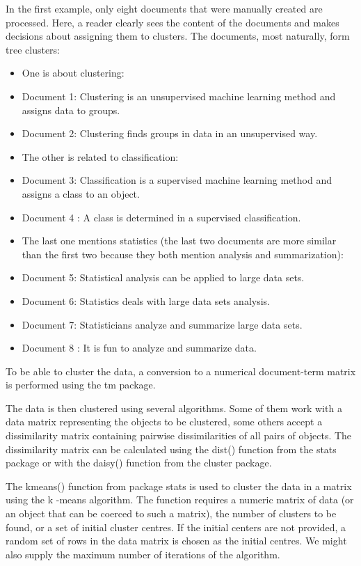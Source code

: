 \documentclass[11pt,openany,executivepaper]{book}
\begin{document}
In the first example, only eight documents that were manually created are processed. Here, a reader clearly sees the content of the documents and makes decisions about assigning them to clusters. The documents, most naturally, form tree clusters:

\begin{itemize}
  \item One is about clustering:
  \item Document 1: Clustering is an unsupervised machine learning method and assigns data to groups.
  \item Document 2: Clustering finds groups in data in an unsupervised way.
  \item The other is related to classification:
  \item Document 3: Classification is a supervised machine learning method and assigns a class to an object.
  \item Document 4 : A class is determined in a supervised classification.
  \item The last one mentions statistics (the last two documents are more similar than the first two because they both mention analysis and summarization):
  \item Document 5: Statistical analysis can be applied to large data sets.
  \item Document 6: Statistics deals with large data sets analysis.
  \item Document 7: Statisticians analyze and summarize large data sets.
  \item Document 8 : It is fun to analyze and summarize data.
\end{itemize}

To be able to cluster the data, a conversion to a numerical document-term matrix is performed using the tm package.

The data is then clustered using several algorithms. Some of them work with a data matrix representing the objects to be clustered, some others accept a dissimilarity matrix containing pairwise dissimilarities of all pairs of objects. The\\
dissimilarity matrix can be calculated using the dist() function from the stats package or with the daisy() function from the cluster package.

The kmeans() function from package stats is used to cluster the data in a matrix using the k -means algorithm. The function requires a numeric matrix of data (or an object that can be coerced to such a matrix), the number of clusters to be found, or a set of initial cluster centres. If the initial centers are not provided, a random set of rows in the data matrix is chosen as the initial centres. We might also supply the maximum number of iterations of the algorithm.
\end{document}
